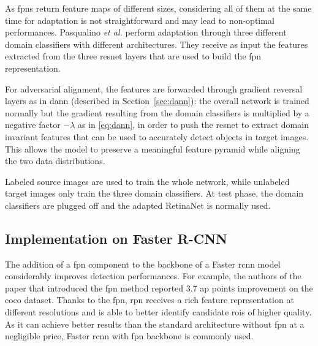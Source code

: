 \documentclass[%
    corpo=12pt,
    twoside,
    stile=classica,   
    tipotesi=magistrale,
    evenboxes,
    english,
	numerazioneromana,
]{toptesi}
\begin{document}
\bigskip
As \glspl{fpn} return feature maps of different sizes, considering all of them at the same time for adaptation is not straightforward and may lead to non-optimal performances. Pasqualino \textit{et al.}\cite{pasqualino2020unsupervised} perform adaptation through three different domain classifiers with different architectures. They receive as input the features extracted from the three \gls{resnet} layers that are used to build the \gls{fpn} representation.

For adversarial alignment, the features are forwarded through gradient reversal layers as in \gls{dann} (described in Section~\ref{sec:dann}): the overall network is trained normally but the gradient resulting from the domain classifiers is multiplied by a negative factor $-\lambda$ as in \eqref{eq:dann}, in order to push the \gls{resnet} to extract domain invariant features that can be used to accurately detect objects in target images. This allows the model to preserve a meaningful feature pyramid while aligning the two data distributions.

\medskip
Labeled source images are used to train the whole network, while unlabeled target images only train the three domain classifiers. At test phase, the domain classifiers are plugged off and the adapted RetinaNet is normally used.

\subsection{Implementation on Faster R-CNN}
The addition of a \gls{fpn} component to the backbone of a Faster \gls{rcnn} model considerably improves detection performances. For example, the authors of the paper that introduced the \gls{fpn} method reported 3.7 \gls{ap} points improvement on the \gls{coco} dataset\cite{lin2017feature}. Thanks to the \gls{fpn}, \gls{rpn} receives a rich feature representation at different resolutions and is able to better identify candidate \glspl{roi} of higher quality. As it can achieve better results than the standard architecture without \gls{fpn} at a negligible price, Faster \gls{rcnn} with \gls{fpn} backbone is commonly used. 
\end{document}
